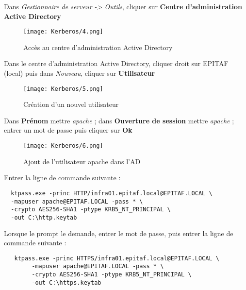 \pagebreak
  Dans \textit{Gestionnaire de serveur -> Outils}, cliquer sur \textbf{Centre d'administration Active Directory}
  \begin{figure}[h!]
     \begin{center}
         \texttt{[image: Kerberos/4.png]}
         \caption{Accès au centre d'administration Active Directory}
         \label{Debian_screenshots/Config/5}
     \end{center}
  \end{figure}
  \FloatBarrier

\pagebreak
   Dans le centre d'administration Active Directory, cliquer droit sur EPITAF (local) puis dans \textit{Nouveau}, cliquer sur \textbf{Utilisateur}
  \begin{figure}[h!]
     \begin{center}
         \texttt{[image: Kerberos/5.png]}
         \caption{Création d'un nouvel utilisateur}
         \label{Debian_screenshots/Config/5}
     \end{center}
  \end{figure}
  \FloatBarrier

\pagebreak
    Dans \textbf{Prénom} mettre \textit{apache} ; dans \textbf{Ouverture de session} mettre \textit{apache} ; entrer un mot de passe puis cliquer sur \textbf{Ok}
  \begin{figure}[h!]
     \begin{center}
         \texttt{[image: Kerberos/6.png]}
         \caption{Ajout de l'utilisateur apache dans l'AD}
         \label{Debian_screenshots/Config/5}
     \end{center}
  \end{figure}
  \FloatBarrier
  
  Entrer la ligne de commande suivante : 
  \begin{verbatim}
  ktpass.exe -princ HTTP/infra01.epitaf.local@EPITAF.LOCAL \ 
  -mapuser apache@EPITAF.LOCAL -pass * \ 
  -crypto AES256-SHA1 -ptype KRB5_NT_PRINCIPAL \ 
  -out C:\http.keytab
  \end{verbatim}
  
  Lorsque le prompt le demande, entrer le mot de passe, puis entrer la ligne de commande suivante :
   \begin{verbatim}
   ktpass.exe -princ HTTPS/infra01.epitaf.local@EPITAF.LOCAL \ 
        -mapuser apache@EPITAF.LOCAL -pass * \ 
        -crypto AES256-SHA1 -ptype KRB5_NT_PRINCIPAL \ 
        -out C:\https.keytab
  \end{verbatim}
  
